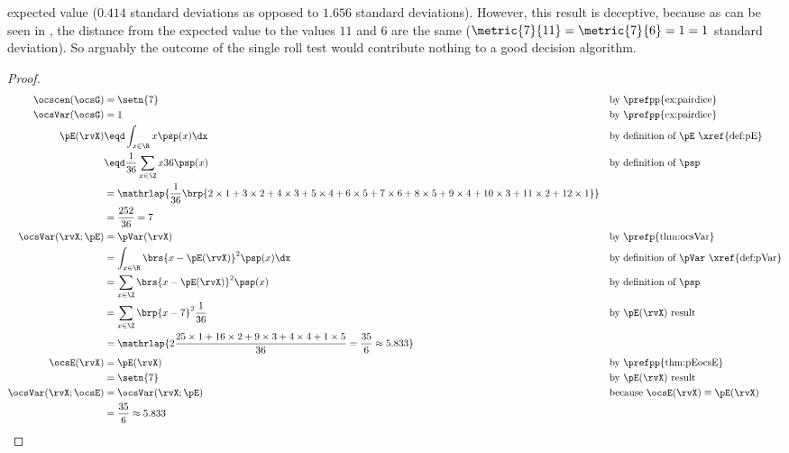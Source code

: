 \begin{tabstr}{0.75}
\begin{example}
expected value ($0.414$ standard deviations as opposed to $1.656$ standard deviations).
However, this result is deceptive, because as can be seen in ,
the distance from the expected value to the values $11$ and $6$ are the same ($\metric{7}{11}=\metric{7}{6}=1 = 1$ standard deviation).
So arguably the outcome of the single roll test would contribute nothing to a good decision algorithm.
\end{example}
\begin{proof}
    \begin{align*}
      \ocscen (\ocsG) &= \setn{7}  && \text{by \prefpp{ex:pairdice}}
      \\
      \ocsVar (\ocsG) &= 1         && \text{by \prefpp{ex:pairdice}}
      \\
      \pE(\rvX)
        &\eqd\int_{x\in\R} x\psp(x)\dx
        && \text{by definition of $\pE$ \xref{def:pE}}
      \\&\eqd\frac{1}{36}\sum_{x\in\Z} x36\psp(x)
        && \text{by definition of $\psp$}
      \\&= \mathrlap{\frac{1}{36}\brp{2\times1 + 3\times2 + 4\times3 +5\times4 + 6\times5 + 7\times6 + 
                            8\times5 + 9\times4 + 10\times3 + 11\times2 + 12\times1}}
      \\&= \frac{252}{36}
         = 7
      \\
      \ocsVar(\rvX;\pE)
        &= \pVar(\rvX)
        && \text{by \prefp{thm:ocsVar}}
      \\&= \int_{x\in\R} \brs{x-\pE(\rvX)}^2 \psp(x)\dx
        &&\text{by definition of $\pVar$ \xref{def:pVar}}
      \\&= \sum_{x\in\Z} \brs{x-\pE(\rvX)}^2 \psp(x)
        &&\text{by definition of $\psp$}
      \\&= \sum_{x\in\Z} \brp{x-7}^2 \frac{1}{36}
        &&\text{by $\pE(\rvX)$ result}
      \\&= \mathrlap{2\frac{25\times1 + 16\times2 + 9\times3 + 4\times4 + 1\times 5}{36}
         = \frac{35}{6} \approx 5.833}
      \\
      \ocsE(\rvX)
        &= \pE(\rvX)
        && \text{by \prefpp{thm:pEocsE}}
      \\&= \setn{7}
        && \text{by $\pE(\rvX)$ result}
      \\
      \ocsVar(\rvX;\ocsE)
        &= \ocsVar(\rvX;\pE)
        && \text{because $\ocsE(\rvX)\equiv\pE(\rvX)$}
      \\&= \frac{35}{6} \approx 5.833

\end{align*}
\end{proof}
\end{tabstr}
